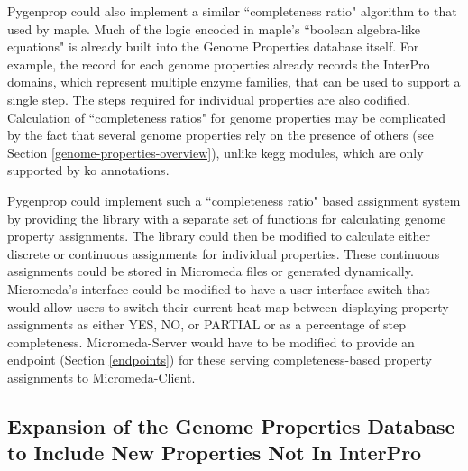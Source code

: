 Pygenprop could also implement a similar ``completeness ratio" algorithm to that 
used by \gls{maple}. Much of the logic encoded in \gls{maple}'s ``boolean 
algebra-like equations" is already built into the Genome Properties database 
itself. For example, the record for each genome properties already records the 
InterPro domains, which represent multiple enzyme families, that can be used to 
support a single step. The steps required for individual properties are also 
codified. Calculation of ``completeness ratios" for genome properties may be 
complicated by the fact that several genome properties rely on the presence of 
others (see Section \ref{genome-properties-overview}), unlike \gls{kegg} 
modules, which are only supported by \gls{ko} annotations.

Pygenprop could implement such a ``completeness ratio" based assignment system 
by providing the library with a separate set of functions for calculating genome property 
assignments. The library could then be modified to calculate either discrete or 
continuous assignments for individual properties. These continuous assignments 
could be stored in Micromeda files or generated dynamically. Micromeda's 
interface could be modified to have a user interface switch that would allow 
users to switch their current heat map between displaying property assignments 
as either YES, NO, or PARTIAL or as a percentage of step completeness. 
Micromeda-Server would have to be modified to provide an endpoint (Section 
\ref{endpoints}) for these serving completeness-based property assignments to 
Micromeda-Client.

\subsection{Expansion of the Genome Properties Database to Include New 
Properties Not In InterPro}

